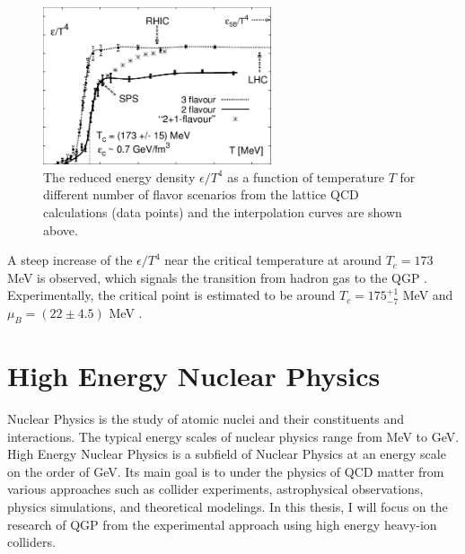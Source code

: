 \begin{figure}[hbtp]
\begin{center}
\includegraphics[width=0.60\textwidth]{Figures/Chapter1/LatticeData.png}
\caption{The reduced energy density $\epsilon/T^4$ as a function of temperature $T$ for different number of flavor scenarios from the lattice QCD calculations (data points) and the interpolation curves are shown above.}
\label{QCDPhaseDiagram}
\end{center}
\end{figure} 


A steep increase of the $\epsilon/T^4$ near the critical temperature at around $T_c  = 173$ MeV is observed, which signals the transition from hadron gas to the QGP \cite{PhaseTrans}. Experimentally, the critical point is estimated to be around $T_c = 175^{+1}_{-7}$ MeV and $\mu_B = (22 \pm 4.5)$ MeV \cite{CriticalPointEX} .













\section{High Energy Nuclear Physics}

Nuclear Physics is the study of atomic nuclei and their constituents and interactions. The typical energy scales of nuclear physics range from MeV to GeV. High Energy Nuclear Physics is a subfield of Nuclear Physics at an energy scale on the order of GeV. Its main goal is to under the physics of QCD matter from various approaches such as collider experiments, astrophysical observations, physics simulations, and theoretical modelings. In this thesis, I will focus on the research of QGP from the experimental approach using high energy heavy-ion colliders.

